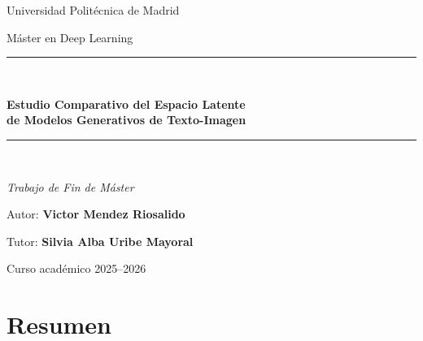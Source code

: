 \documentclass[12pt, a4paper, twoside]{book}
\begin{document}

\begin{titlepage}
  \centering
  \vspace*{2cm}
  {\Large Universidad Politécnica de Madrid\par}
  \vspace{0.5cm}
  {\large Máster en Deep Learning\par}
  \vspace{3cm}
  \rule{\linewidth}{0.5pt}\\[0.4cm]
  {\LARGE\bfseries Estudio Comparativo del Espacio Latente\\[0.3cm]
   de Modelos Generativos de Texto-Imagen\par}
  \rule{\linewidth}{0.5pt}\\[1.5cm]
  {\large\itshape Trabajo de Fin de Máster\par}
  \vspace{2cm}
  {\large Autor: \textbf{Victor Mendez Riosalido}\par}
  \vspace{0.5cm}
  {\large Tutor: \textbf{Silvia Alba Uribe Mayoral}\par}
  \vfill
  {\large Curso académico 2025--2026\par}
\end{titlepage}

\frontmatter

\chapter*{Resumen}
\end{document}
